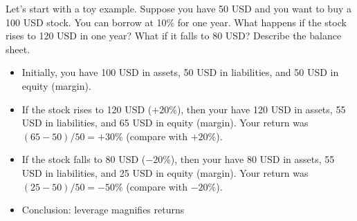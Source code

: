 \documentclass{beamer}
\begin{document}
\begin{frame}{}
	\small
	Let's start with a toy example. Suppose you have 50 USD and you want to buy a 100 USD stock. You can borrow at 10\% for one year. What happens if the stock rises to 120 USD in one year? What if it falls to 80 USD? Describe the balance sheet.
		\pause
		\begin{itemize}
			\item{\color{blue} Initially, you have 100 USD in assets, 50 USD in liabilities, and 50 USD in equity (margin).}
			\item{\color{blue} If the stock rises to 120 USD ($+20\%$), then your have 120 USD in assets, 55 USD in liabilities, and 65 USD in equity (margin). Your return was $(65-50)/50=+30\%$ (compare with $+20\%$).}
			\item{\color{blue} If the stock falls to 80 USD ($-20\%$), then your have 80 USD in assets, 55 USD in liabilities, and 25 USD in equity (margin). Your return was $(25-50)/50=-50\%$ (compare with $-20\%$).}
			\item{\color{blue} Conclusion: leverage magnifies returns}
		\end{itemize}
\end{frame}
\end{document}
